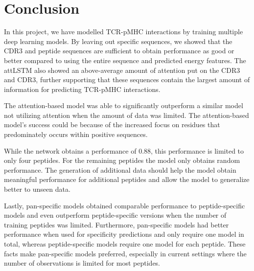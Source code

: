 \section{Conclusion} \label{conclusion}
In this project, we have modelled TCR-pMHC interactions by training multiple deep learning models. By leaving out specific sequences, we showed that the CDR3 and peptide sequences are sufficient to obtain performance as good or better compared to using the entire sequence and predicted energy features. The attLSTM also showed an above-average amount of attention put on the CDR3{\textalpha} and CDR3{\textbeta}, further supporting that these sequences contain the largest amount of information for predicting TCR-pMHC interactions.

The attention-based model was able to significantly outperform a similar model not utilizing attention when the amount of data was limited. The attention-based model's success could be because of the increased focus on residues that predominately occurs within positive sequences.

While the network obtains a performance of 0.88, this performance is limited to only four peptides. For the remaining peptides the model only obtains random performance. The generation of additional data should help the model obtain meaningful performance for additional peptides and allow the model to generalize better to unseen data.

Lastly, pan-specific models obtained comparable performance to peptide-specific models and even outperform peptide-specific versions when the number of training peptides was limited. Furthermore, pan-specific models had better performance when used for specificity predictions and only require one model in total, whereas peptide-specific models require one model for each peptide. These facts make pan-specific models preferred, especially in current settings where the number of observations is limited for most peptides.

